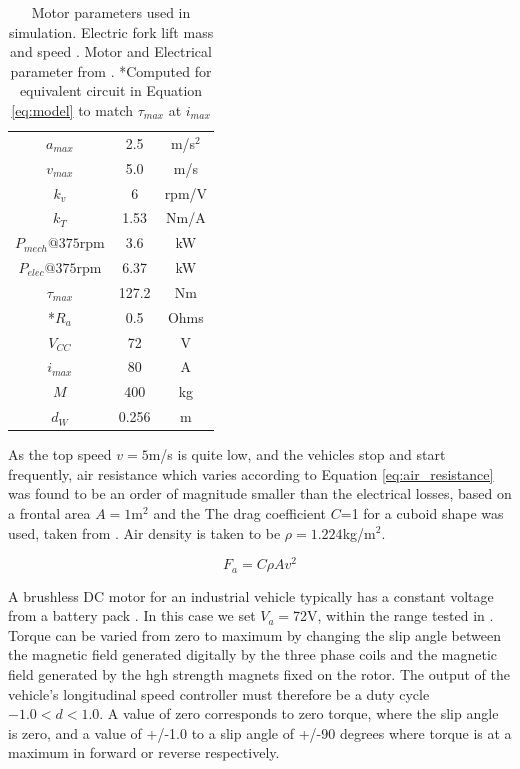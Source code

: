  \begin{table}
 	\caption{Motor parameters used in simulation. Electric fork lift mass and speed \cite{Hyster2020a}. Motor and Electrical parameter from \cite{Racewicz2018}. *Computed for equivalent circuit in Equation \ref{eq:model} to match $\tau_{max}$ at $i_{max}$ }
 	\label{tab:motor_params} 
 	\centering
 	\begin{tabular}{ |c|c|c| }
 		\hline
 		$a_{max}$ & 2.5 & m/s$^2$\\
 		$v_{max}$ & 5.0& m/s \\
 		$k_v$ & 6 & rpm/V\\ 
 		$k_T$ & 1.53 & Nm/A\\ 
 		$P_{mech}@375$rpm & 3.6 & kW\\ 
 		$P_{elec}@375$rpm & 6.37 & kW \\
 		$\tau_{max}$ & 127.2 & Nm\\
 		*$R_a$ & 0.5 & Ohms\\
 		$V_{CC}$ & 72 & V\\
 		$i_{max}$ & 80 & A\\
 		$M$ & 400 & kg\\
 		$d_W$ & 0.256 & m\\
 		\hline
 	\end{tabular}
 \end{table}

As the top speed $v=5$m/s is quite low, and the vehicles stop and start frequently, air resistance which varies according to Equation \ref{eq:air_resistance} was found to be an order of magnitude smaller than the electrical losses, based on a frontal area $A=1$m$^2$ and the The drag coefficient $C$=1 for a cuboid shape was used, taken from \cite{Toolbox2004}. Air density is taken to be $\rho=1.224$kg/m$^2$.

\begin{equation}
F_a = C\rho A v^2 
\label{eq:air_resistance}
\end{equation}

A brushless DC motor for an industrial vehicle typically has a constant voltage from a battery pack \cite{Hyster2020a}. In this case we set $V_a=$72V, within the range tested in \cite{Racewicz2018}. Torque can be varied from zero to maximum by changing the slip angle between the magnetic field generated digitally by the three phase coils and the magnetic field generated by the hgh strength magnets fixed on  the rotor. The output of the vehicle's longitudinal speed controller must therefore be a duty cycle $-1.0<d<1.0$. A value of zero corresponds to zero torque, where the slip angle is zero, and a value of +/-1.0 to a slip angle of +/-90 degrees where torque is at a maximum in forward or reverse respectively.


